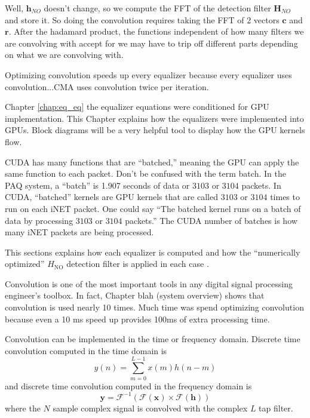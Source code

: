 Well, $\mathbf{h}_{NO}$ doesn't change, so we compute the FFT of the detection filter $\mathbf{H}_{NO}$ and store it.
So doing the convolution requires taking the FFT of 2 vectors $\mathbf{c}$ and $\mathbf{r}$.
After the hadamard product, the functions independent of how many filters we are convolving with accept for we may have to trip off different parts depending on what we are convolving with.

Optimizing convolution speeds up every equalizer because every equalizer uses convolution...CMA uses convolution twice per iteration. 

Chapter \ref{chap:eq_eq} the equalizer equations were conditioned for GPU implementation.
This Chapter explains how the equalizers were implemented into GPUs.
Block diagrams will be a very helpful tool to display how the GPU kernels flow.

CUDA has many functions that are ``batched,'' meaning the GPU can apply the same function to each packet.
Don't be confused with the term batch. 
In the PAQ system, a ``batch'' is 1.907 seconds of data or $3103$ or $3104$ packets.
In CUDA, ``batched'' kernels are GPU kernels that are called $3103$ or $3104$ times to run on each iNET packet.
One could say ``The batched kernel runs on a batch of data by processing $3103$ or $3104$ packets.'' 
The CUDA number of batches is how many iNET packets are being processed.

This sections explains how each equalizer is computed and how the ``numerically optimized'' $H_\text{NO}$ detection filter is applied in each case \cite[Fig. 3]{perrins:2013}.




\label{chap:gpu_convolution}
Convolution is one of the most important tools in any digital signal processing engineer's toolbox. 
In fact, Chapter blah (system overview) shows that convolution is used nearly 10 times.
Much time was spend optimizing convolution because even a 10 ms speed up provides 100ms of extra processing time.

Convolution can be implemented in the time or frequency domain. 
Discrete time convolution computed in the time domain is
\begin{equation}
y(n) = \sum^{L-1}_{m=0} x(m) h(n-m)
  \label{eq:simple_conv_time}
\end{equation}
and discrete time convolution computed in the frequency domain is
\begin{equation}
\mathbf{y} = \mathscr{F}^{-1}(\mathscr{F}(\mathbf{x})\times\mathscr{F}(\mathbf{h}))
  \label{eq:simple_conv_freq}
\end{equation}
where the $N$ sample complex signal is convolved with the complex $L$ tap filter.

